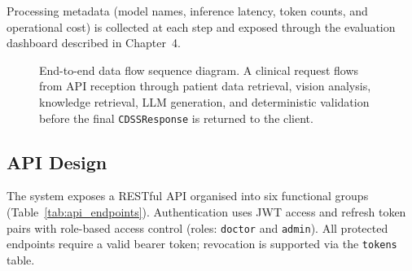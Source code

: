 \documentclass[12pt,a4paper]{report}
\begin{document}
	Processing metadata (model names, inference latency, token counts, and operational cost)
	is collected at each step and exposed through the evaluation dashboard described in
	Chapter~4.
	
\begin{figure}[h]
	\centering
	\caption{End-to-end data flow sequence diagram. A clinical request flows from API
		reception through patient data retrieval, vision analysis, knowledge retrieval,
		LLM generation, and deterministic validation before the final
		\texttt{CDSSResponse} is returned to the client.}
	\label{fig:dataflow}
\end{figure}
	
	\subsection*{API Design}
	
	The system exposes a RESTful API organised into six functional groups
	(Table~\ref{tab:api_endpoints}). Authentication uses JWT access and refresh token pairs
	with role-based access control (roles: \texttt{doctor} and \texttt{admin}). All protected
	endpoints require a valid bearer token; revocation is supported via the \texttt{tokens}
	table.
		
\end{document}
